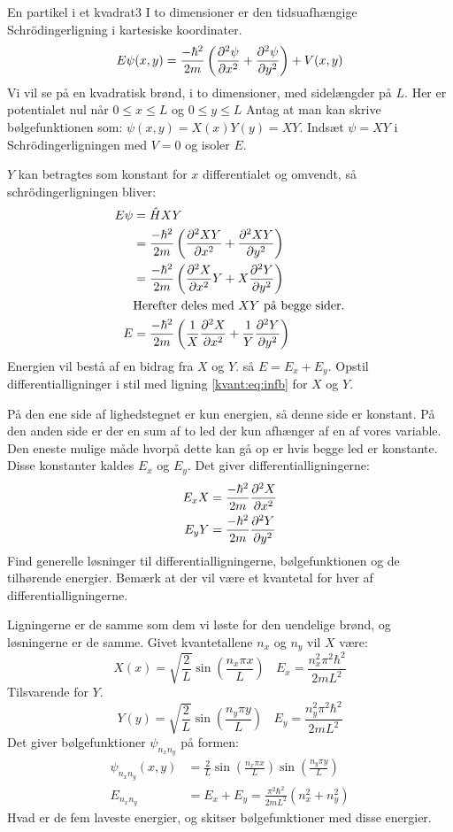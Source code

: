 \begin{opgave}{En partikel i et kvadrat}{3}
\label{kvant:opg:2dinf}
I to dimensioner er den tidsuafhængige Schrödingerligning i kartesiske koordinater.
$$
E\psi(x,y) = \frac{-\hbar^2}{2m}\left(\pdif[2]{x}\psi +\pdif[2]{y}\psi\right) + V(x,y)
$$
Vi vil se på en kvadratisk brønd, i to dimensioner, med sidelængder på $L$. Her er potentialet nul når $0\leq x\leq L$ og $0\leq y\leq L$
Antag at man kan skrive bølgefunktionen som: $\psi(x,y) = X(x)Y(y) = XY$.
\opg Indsæt $\psi = XY$ i Schrödingerligningen med $V=0$ og isoler $E$.

$Y$ kan betragtes som konstant for $x$ differentialet og omvendt, så schrödingerligningen bliver:
\begin{align*}
    E\psi &= \op HXY\\
    &= \frac{-\hbar^2}{2m}\left(\pdif[2]{x}{XY}+\pdif[2]{y}{XY}\right)\\
    &= \frac{-\hbar^2}{2m}\left(\pdif[2]{x}{X}Y+X\pdif[2]{y}{Y}\right)\\
    &\text{Herefter deles med $XY$ på begge sider.}\\
    E &= \frac{-\hbar^2}{2m}\left(\frac{1}{X}\pdif[2]{x}{X}+\frac{1}{Y}\pdif[2]{y}{Y}\right)
\end{align*}
\opg Energien vil bestå af en bidrag fra $X$ og $Y$. så $E=E_x+E_y$. Opstil differentialligninger i stil med ligning \eqref{kvant:eq:infb} for $X$ og $Y$.

På den ene side af lighedstegnet er kun energien, så denne side er konstant. På den anden side er der en sum af to led der kun afhænger af en af vores variable. Den eneste mulige måde hvorpå dette kan gå op er hvis begge led er konstante. Disse konstanter kaldes $E_x$ og $E_y$. Det giver differentialligningerne:
\begin{align*}
    E_x X &= \frac{-\hbar^2}{2m}\pdif[2]{x}{X}\\
    E_y Y &= \frac{-\hbar^2}{2m}\pdif[2]{y}{Y}
\end{align*}
\opg Find generelle løsninger til differentialligningerne, bølgefunktionen og de tilhørende energier. Bemærk at der vil være et kvantetal for hver af differentialligningerne.

Ligningerne er de samme som dem vi løste for den uendelige brønd, og løsningerne er de samme.
Givet kvantetallene $n_x$ og $n_y$ vil $X$ være:
$$
X(x) = \sqrt{\frac{2}{L}}\sin\left(\frac{n_x\pi x}{L}\right)~~~~E_x = \frac{n_x^2\pi^2\hbar^2}{2mL^2}
$$
Tilsvarende for $Y$.
$$
Y(y) = \sqrt{\frac{2}{L}}\sin\left(\frac{n_y\pi y}{L}\right)~~~~E_y = \frac{n_y^2\pi^2\hbar^2}{2mL^2}
$$
Det giver bølgefunktioner $\psi_{n_xn_y}$ på formen:
\begin{align*}
    \psi_{n_xn_y}(x,y) &= \frac{2}{L}\sin\left(\frac{n_x\pi x}{L}\right)\sin\left(\frac{n_y\pi y}{L}\right)\\
    E_{n_xn_y} &= E_x+E_y = \frac{\pi^2\hbar^2}{2mL^2}(n_x^2+n_y^2)
\end{align*}
\opg Hvad er de fem laveste energier, og skitser bølgefunktioner med disse energier.


\end{opgave}
